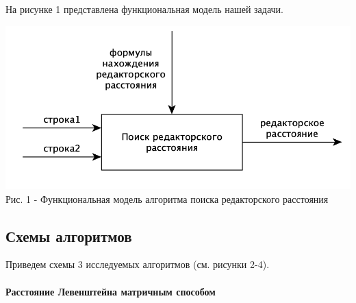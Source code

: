 \documentclass[a4paper,14pt]{article} %
\begin{document}
	На рисунке 1 представлена функциональная модель нашей задачи.  
	\begin{center}
		\includegraphics[scale = 0.8]{idef0} \\ Рис.  1 - Функциональная модель алгоритма поиска редакторского расстояния
	\end{center}
        
        \subsection{Схемы алгоритмов}
        Приведем схемы 3 исследуемых алгоритмов (см. рисунки 2-4). 
        
        \paragraph{Расстояние Левенштейна матричным способом}
        
\end{document}
